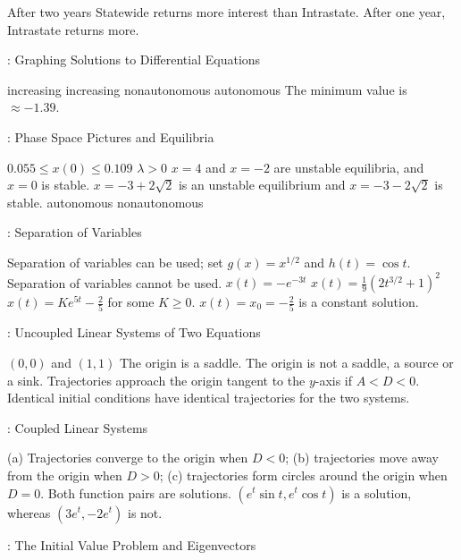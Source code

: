 \ans After two years Statewide returns more interest than Intrastate.  
After one year, Intrastate returns more.


: Graphing Solutions to Differential Equations

 increasing
 increasing
 nonautonomous
 autonomous
  The minimum value is $\approx -1.39$.  


: Phase Space Pictures and Equilibria

 \ans $0.055 \leq x(0) \leq 0.109$
 \ans $\lambda > 0$
\ans $x=4$ and $x = -2$ are unstable equilibria, and $x = 0$ is stable.
 \ans $x = -3+2\sqrt{2}$ is an unstable equilibrium and 
$x = -3-2\sqrt{2}$ is stable.
 \ans autonomous
 nonautonomous



: Separation of Variables

 \ans Separation of variables can be used; set $g(x) = x^{1/2}$ 
and $h(t) = \cos t$.
 \ans Separation of variables cannot be used.
 \ans $x(t) = -e^{-3t}$
 \ans $x(t) = \frac{1}{9}(2t^{3/2} + 1)^2$
 \ans $x(t) = Ke^{5t} - \frac{2}{5}$ for some $K \geq 0$.  
$x(t) = x_0 = -\frac{2}{5}$ is a constant solution.


: Uncoupled Linear Systems of Two Equations

 \ans $(0,0)$ and $(1,1)$
 \ans The origin is a saddle.
 The origin is not a saddle, a source or a sink. 
  \ans Trajectories approach the origin tangent to the $y$-axis 
if $A < D < 0$. 
 \ans Identical initial conditions have identical trajectories
for the two systems. 


:  Coupled Linear Systems

(a) Trajectories converge to the origin when $D < 0$;
(b) trajectories move away from the origin when $D > 0$;
(c) trajectories form circles around the origin when $D = 0$.
 \ans Both function pairs are solutions.
 \ans $(e^t\sin{t},e^t\cos{t})$ is a
solution, whereas $(3e^t,-2e^t)$ is not.


:  The Initial Value Problem and Eigenvectors

